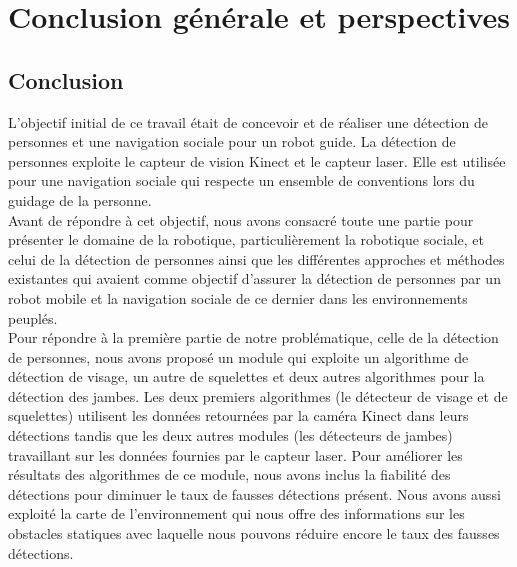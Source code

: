 \chapter*{Conclusion générale et perspectives}%
\label{Chapter14} %

\section{Conclusion}
\tab L'objectif initial de ce travail était de concevoir et de réaliser une détection de personnes et une navigation sociale pour un robot guide. La détection de personnes exploite le capteur de vision Kinect et le capteur laser. Elle est utilisée pour une navigation sociale qui respecte un ensemble de conventions lors du guidage de la personne.\vspace{5px}\\
\tab Avant de répondre à cet objectif, nous avons consacré toute une partie pour présenter le domaine de la robotique, particulièrement la robotique sociale, et celui de la détection de personnes ainsi que les différentes approches et méthodes existantes qui avaient comme objectif d'assurer la détection de personnes par un robot mobile et la navigation sociale de ce dernier dans les environnements peuplés.\vspace{5px}\\
\tab Pour répondre à la première partie de notre problématique, celle de la détection de personnes, nous avons proposé un module qui exploite un algorithme de détection de visage, un autre de squelettes et deux autres algorithmes pour la détection des jambes. Les deux premiers algorithmes (le détecteur de visage et de squelettes) utilisent les données retournées par la caméra Kinect dans leurs détections tandis que les deux autres modules (les détecteurs de jambes) travaillant sur les données fournies par le capteur laser. Pour améliorer les résultats des algorithmes de ce module, nous avons inclus la fiabilité des détections pour diminuer le taux de fausses détections présent. Nous avons aussi exploité la carte de l'environnement qui nous offre des informations sur les obstacles statiques avec laquelle nous pouvons réduire encore le taux des fausses détections.\vspace{5px}\\

